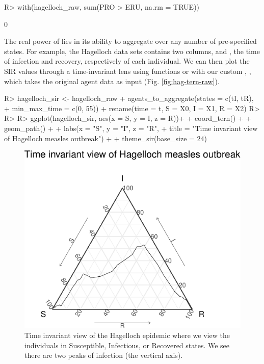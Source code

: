\documentclass[
  shortnames]{jss}
\begin{document}
\begin{CodeChunk}
\begin{CodeInput}
R> with(hagelloch_raw, sum(PRO > ERU, na.rm = TRUE))
\end{CodeInput}
\begin{CodeOutput}
[1] 0
\end{CodeOutput}
\end{CodeChunk}

The real power of  lies in its ability to
aggregate over any number of pre-specified states. For example, the
Hagelloch data sets contains two columns,  and , the
time of infection and recovery, respectively of each individual. We can
then plot the SIR values through a time-invariant lens using
 functions or with our custom ,
, which takes the original agent data as input
(Fig. \ref{fig:hag-tern-raw}).

\begin{CodeChunk}
\begin{CodeInput}
R> hagelloch_sir <- hagelloch_raw %
+   agents_to_aggregate(states = c(tI, tR),
+                       min_max_time = c(0, 55)) %
+   rename(time = t, S = X0, I = X1, R = X2)
R> 
R> 
R> ggplot(hagelloch_sir, aes(x = S, y = I, z = R))+
+   coord_tern() +
+   geom_path() +
+   labs(x = "S", y = "I", z = "R",
+        title = "Time invariant view of Hagelloch measles outbreak") + 
+   theme_sir(base_size = 24)
\end{CodeInput}
\begin{figure}[H]

{\centering \includegraphics{Figs/unnamed-chunk-8-1} 

}

\caption{\label{fig:hag-tern-raw}Time invariant view of the Hagelloch epidemic where we view the individuals in Susceptible, Infectious, or Recovered states.  We see there are two peaks of infection (the vertical axis).}\label{fig:unnamed-chunk-8}
\end{figure}
\end{CodeChunk}
\end{document}
